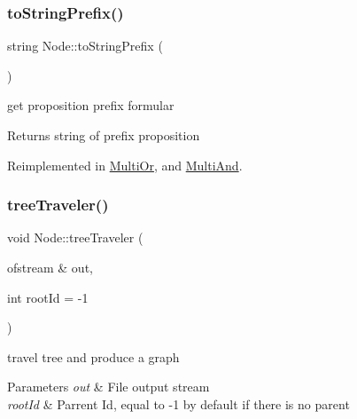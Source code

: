 \mbox{\label{class_node_a815b062345cf2bb42717bd16dc99ea27}} 
\subsubsection{\texorpdfstring{to\+String\+Prefix()}{toStringPrefix()}}
{\footnotesize\ttfamily string Node\+::to\+String\+Prefix (\begin{DoxyParamCaption}{ }\end{DoxyParamCaption})\hspace{0.3cm}{\ttfamily [virtual]}}



get proposition prefix formular 

\begin{DoxyReturn}{Returns}
string of prefix proposition 
\end{DoxyReturn}


Reimplemented in \hyperlink{class_multi_or_a80405614a8a8db0992c35a70f36aa025}{Multi\+Or}, and \hyperlink{class_multi_and_a00dd6431f647c88e28d702dd2afb1c57}{Multi\+And}.

\mbox{\label{class_node_a068e821ecc21903e5b3430e36493f390}} 
\subsubsection{\texorpdfstring{tree\+Traveler()}{treeTraveler()}}
{\footnotesize\ttfamily void Node\+::tree\+Traveler (\begin{DoxyParamCaption}\item[{ofstream \&}]{out,  }\item[{int}]{root\+Id = {\ttfamily -\/1} }\end{DoxyParamCaption})}



travel tree and produce a graph 


\begin{DoxyParams}{Parameters}
{\em out} & File output stream \\
\hline
{\em root\+Id} & Parrent Id, equal to -\/1 by default if there is no parent \\
\hline
\end{DoxyParams}


